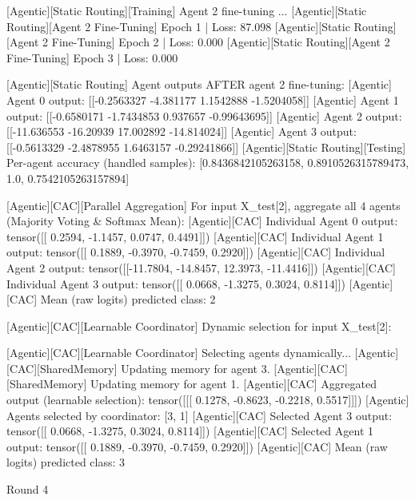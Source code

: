 [Agentic][Static Routing][Training] Agent 2 fine-tuning ...
[Agentic][Static Routing][Agent 2 Fine-Tuning] Epoch 1 | Loss: 87.098
[Agentic][Static Routing][Agent 2 Fine-Tuning] Epoch 2 | Loss: 0.000
[Agentic][Static Routing][Agent 2 Fine-Tuning] Epoch 3 | Loss: 0.000

[Agentic][Static Routing] Agent outputs AFTER agent 2 fine-tuning:
[Agentic] Agent 0 output: [[-0.2563327 -4.381177   1.1542888 -1.5204058]]
[Agentic] Agent 1 output: [[-0.6580171  -1.7434853   0.937657   -0.99643695]]
[Agentic] Agent 2 output: [[-11.636553 -16.20939   17.002892 -14.814024]]
[Agentic] Agent 3 output: [[-0.5613329  -2.4878955   1.6463157  -0.29241866]]
[Agentic][Static Routing][Testing] Per-agent accuracy (handled samples): [0.8436842105263158, 0.8910526315789473, 1.0, 0.7542105263157894]

[Agentic][CAC][Parallel Aggregation] For input X_test[2], aggregate all 4 agents (Majority Voting & Softmax Mean):
[Agentic][CAC] Individual Agent 0 output: tensor([[ 0.2594, -1.1457,  0.0747,  0.4491]])
[Agentic][CAC] Individual Agent 1 output: tensor([[ 0.1889, -0.3970, -0.7459,  0.2920]])
[Agentic][CAC] Individual Agent 2 output: tensor([[-11.7804, -14.8457,  12.3973, -11.4416]])
[Agentic][CAC] Individual Agent 3 output: tensor([[ 0.0668, -1.3275,  0.3024,  0.8114]])
[Agentic][CAC] Mean (raw logits) predicted class: 2

[Agentic][CAC][Learnable Coordinator] Dynamic selection for input X_test[2]:

[Agentic][CAC][Learnable Coordinator] Selecting agents dynamically...
[Agentic][CAC][SharedMemory] Updating memory for agent 3.
[Agentic][CAC][SharedMemory] Updating memory for agent 1.
[Agentic][CAC] Aggregated output (learnable selection): tensor([[[ 0.1278, -0.8623, -0.2218,  0.5517]]])
[Agentic] Agents selected by coordinator: [3, 1]
[Agentic][CAC] Selected Agent 3 output: tensor([[ 0.0668, -1.3275,  0.3024,  0.8114]])
[Agentic][CAC] Selected Agent 1 output: tensor([[ 0.1889, -0.3970, -0.7459,  0.2920]])
[Agentic][CAC] Mean (raw logits) predicted class: 3

Round 4

